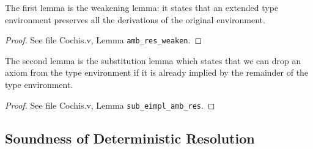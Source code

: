 The first lemma is the weakening lemma: it states that an extended type environment
preserves all the derivations of the original environment.

{\centering
{}}
\begin{proof}
See file Cochis.v, Lemma \texttt{amb\_res\_weaken}.
\end{proof}
The second lemma is the substitution lemma which states that
we can drop an axiom from the type environment if it is already implied
by the remainder of the type environment.

{\centering
{}}
\begin{proof}
	See file Cochis.v, Lemma \texttt{sub\_eimpl\_amb\_res}.
\end{proof}

\subsection{Soundness of Deterministic Resolution}

